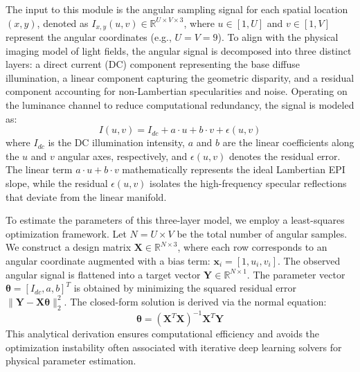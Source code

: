 The input to this module is the angular sampling signal for each spatial location $(x,y)$, denoted as $I_{x,y}(u,v) \in \mathbb{R}^{U \times V \times 3}$, where $u \in [1, U]$ and $v \in [1, V]$ represent the angular coordinates (e.g., $U=V=9$). To align with the physical imaging model of light fields, the angular signal is decomposed into three distinct layers: a direct current (DC) component representing the base diffuse illumination, a linear component capturing the geometric disparity, and a residual component accounting for non-Lambertian specularities and noise. Operating on the luminance channel to reduce computational redundancy, the signal is modeled as:
\begin{equation}
\label{eq:eq4}
I(u,v) = I_{dc} + a \cdot u + b \cdot v + \epsilon(u,v)
\end{equation}
where $I_{dc}$ is the DC illumination intensity, $a$ and $b$ are the linear coefficients along the $u$ and $v$ angular axes, respectively, and $\epsilon(u,v)$ denotes the residual error. The linear term $a \cdot u + b \cdot v$ mathematically represents the ideal Lambertian EPI slope, while the residual $\epsilon(u,v)$ isolates the high-frequency specular reflections that deviate from the linear manifold.

To estimate the parameters of this three-layer model, we employ a least-squares optimization framework. Let $N = U \times V$ be the total number of angular samples. We construct a design matrix $\mathbf{X} \in \mathbb{R}^{N \times 3}$, where each row corresponds to an angular coordinate augmented with a bias term: $\mathbf{x}_i = [1, u_i, v_i]$. The observed angular signal is flattened into a target vector $\mathbf{Y} \in \mathbb{R}^{N \times 1}$. The parameter vector $\boldsymbol{\theta} = [I_{dc}, a, b]^T$ is obtained by minimizing the squared residual error $\|\mathbf{Y} - \mathbf{X}\boldsymbol{\theta}\|_2^2$. The closed-form solution is derived via the normal equation:
\begin{equation}
\label{eq:eq5}
\boldsymbol{\theta} = (\mathbf{X}^T \mathbf{X})^{-1} \mathbf{X}^T \mathbf{Y}
\end{equation}
This analytical derivation ensures computational efficiency and avoids the optimization instability often associated with iterative deep learning solvers for physical parameter estimation.

